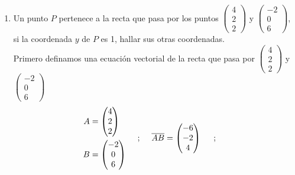 \documentclass{article}
\begin{document}
\maketitle
\begin{enumerate}
    \item Un punto \(P\) pertenece a la recta que pasa por los puntos \(\left(\begin{smallmatrix}4 \\ 2 \\ 2\end{smallmatrix}\right)\) y \(\left(\begin{smallmatrix}-2 \\ 0 \\ 6\end{smallmatrix}\right)\), si la coordenada \(y\) de \(P\) es 1, hallar sus otras coordenadas. \\
        Primero definamos una ecuación vectorial de la recta que pasa por \(\left(\begin{smallmatrix}4 \\ 2 \\ 2\end{smallmatrix}\right)\) y \(\left(\begin{smallmatrix}-2 \\ 0 \\ 6\end{smallmatrix}\right)\)        
        \[
            \begin{aligned}
                A &= \begin{pmatrix}4 \\ 2 \\ 2\end{pmatrix} \\
                B &= \begin{pmatrix}-2 \\ 0 \\ 6\end{pmatrix} 
            \end{aligned}
            \hspace{0.5cm}
            \text{;}
            \hspace{0.5cm}
            \overline{AB} = \begin{pmatrix}-6 \\ -2 \\ 4\end{pmatrix}
            \hspace{0.5cm}
            \text{;}
            \hspace{0.5cm}
\]
\end{enumerate}
\end{document}
